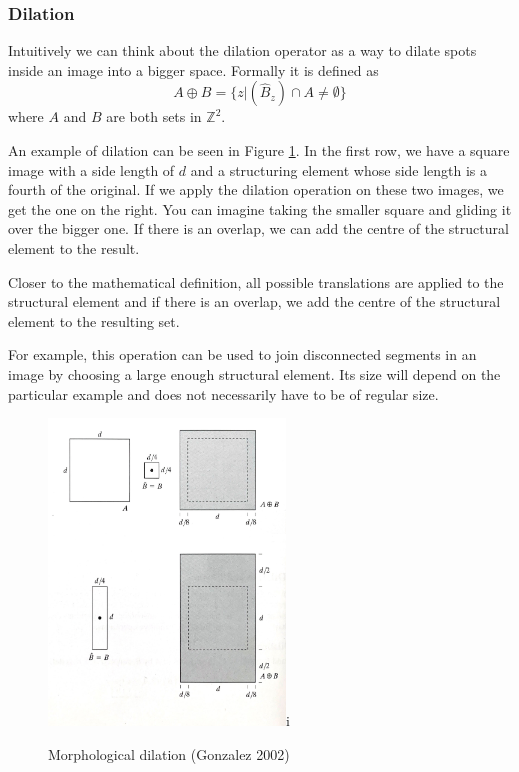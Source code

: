 \documentclass[
  digital,     %
  oneside,     %
  nosansbold,  %
  nocolorbold, %
  lof,         %
  lot,         %
]{fithesis4}
\newcommand*{\Z}{\ensuremath{\mathbb{Z}}}
\begin{document}
\subsubsection{Dilation}
Intuitively we can think about the dilation operator as a way to dilate spots
inside an image into a bigger space. Formally it is defined as
\cite{gonzalez2002}
$$A \oplus B = \{z | (\hat{B}_z) \cap A \neq \emptyset\}$$
where $A$ and $B$ are both sets in $\Z^2$.

An example of dilation can be seen in Figure \ref{fig:morph_dilation}. In the
first row, we have a square image with a side length of $d$ and a structuring
element whose side length is a fourth of the original. If we apply the dilation
operation on these two images, we get the one on the right. You can imagine
taking the smaller square and gliding it over the bigger one. If there is an
overlap, we can add the centre of the structural element to the result.

Closer to the mathematical definition, all possible translations are applied to
the structural element and if there is an overlap, we add the centre of the
structural element to the resulting set.

For example, this operation can be used to join disconnected segments in an
image by choosing a large enough structural element. Its size will depend on the
particular example and does not necessarily have to be of regular size.

\begin{figure}
    \begin{center}
        \includegraphics[width=6.3cm]{resources/morph_dilation.jpg}i
    \end{center}
    \caption{Morphological dilation (Gonzalez 2002)} %
    \label{fig:morph_dilation}
\end{figure}
\end{document}
